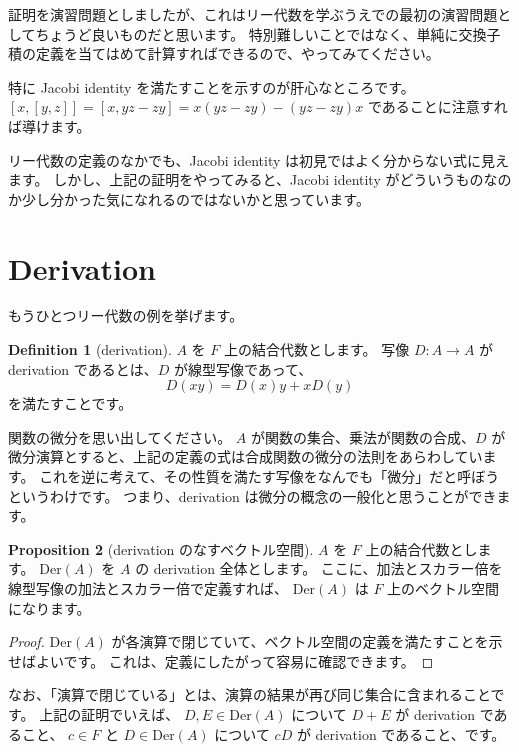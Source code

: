 \documentclass{ltjsarticle}
\theoremstyle{definition}
\newtheorem{definition}{Definition}[section]
\newtheorem{proposition}[definition]{Proposition}
\begin{document}
証明を演習問題としましたが、これはリー代数を学ぶうえでの最初の演習問題としてちょうど良いものだと思います。
特別難しいことではなく、単純に交換子積の定義を当てはめて計算すればできるので、やってみてください。

特に Jacobi identity を満たすことを示すのが肝心なところです。
$[x, [y, z]] = [x, yz - zy] = x(yz - zy) - (yz - zy)x$ であることに注意すれば導けます。

リー代数の定義のなかでも、Jacobi identity は初見ではよく分からない式に見えます。
しかし、上記の証明をやってみると、Jacobi identity がどういうものなのか少し分かった気になれるのではないかと思っています。

\section{Derivation}

もうひとつリー代数の例を挙げます。

\begin{definition}[derivation]
    $A$ を $F$ 上の結合代数とします。
    写像 $D : A \to A$ が derivation であるとは、$D$ が線型写像であって、
    \[
        D(xy) = D(x)y + xD(y)
    \]
    を満たすことです。
\end{definition}

関数の微分を思い出してください。
$A$ が関数の集合、乗法が関数の合成、$D$ が微分演算とすると、上記の定義の式は合成関数の微分の法則をあらわしています。
これを逆に考えて、その性質を満たす写像をなんでも「微分」だと呼ぼうというわけです。
つまり、derivation は微分の概念の一般化と思うことができます。

\begin{proposition}[derivation のなすベクトル空間]
    $A$ を $F$ 上の結合代数とします。
    $\mathrm{Der}(A)$ を $A$ の derivation 全体とします。
    ここに、加法とスカラー倍を線型写像の加法とスカラー倍で定義すれば、
    $\mathrm{Der}(A)$ は $F$ 上のベクトル空間になります。
\end{proposition}

\begin{proof}
    $\mathrm{Der}(A)$ が各演算で閉じていて、ベクトル空間の定義を満たすことを示せばよいです。
    これは、定義にしたがって容易に確認できます。
\end{proof}

なお、「演算で閉じている」とは、演算の結果が再び同じ集合に含まれることです。
上記の証明でいえば、
$D, E \in \mathrm{Der}(A)$ について $D + E$ が derivation であること、
$c \in F$ と $D \in \mathrm{Der}(A)$ について $cD$ が derivation であること、です。
\end{document}
